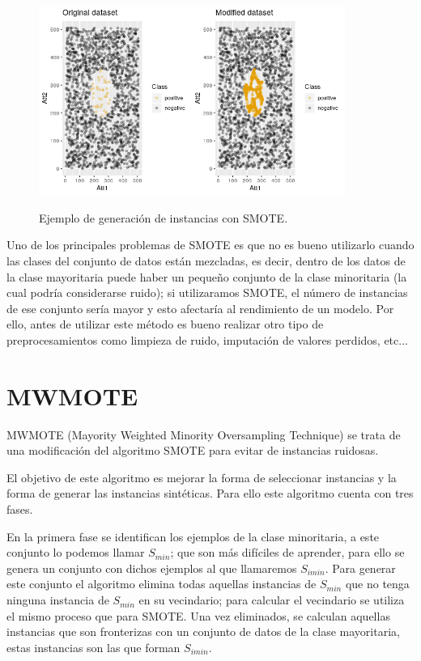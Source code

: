 \begin{figure}[h]
	\centering
	\includegraphics[width=100mm]{imagenes/SMOTE_comparison.png}
	\label{fig:41}
	\caption{Ejemplo de generación de instancias con SMOTE.}
\end{figure}
\verticalspace

Uno de los principales problemas de SMOTE es que no es bueno utilizarlo cuando las clases del conjunto de datos están mezcladas, es decir, dentro de los datos de la clase mayoritaria puede haber un pequeño conjunto de la clase minoritaria (la cual podría considerarse ruido); si utilizaramos SMOTE, el número de instancias de ese conjunto sería mayor y esto afectaría al rendimiento de un modelo. Por ello, antes de utilizar este método es bueno realizar otro tipo de preprocesamientos como limpieza de ruido, imputación de valores perdidos, etc...
\newpage
\section{MWMOTE}
MWMOTE (Mayority Weighted Minority Oversampling Technique) se trata de una modificación del algoritmo SMOTE para evitar de instancias ruidosas.\newline

El objetivo de este algoritmo es mejorar la forma de seleccionar instancias y la forma de generar las instancias sintéticas. Para ello este algoritmo cuenta con tres fases.\newline

En la primera fase se identifican los ejemplos de la clase minoritaria, a este conjunto lo podemos llamar $S_{min}$; que son más difíciles de aprender, para ello se genera un conjunto con dichos ejemplos al que llamaremos $S_{imin}$. Para generar este conjunto el algoritmo elimina todas aquellas instancias de $S_{min}$ que no tenga ninguna instancia de $S_{min}$ en su vecindario; para calcular el vecindario se utiliza el mismo proceso que para SMOTE. Una vez eliminados, se calculan aquellas instancias que son fronterizas con un conjunto de datos de la clase mayoritaria, estas instancias son las que forman $S_{imin}$.\newline

